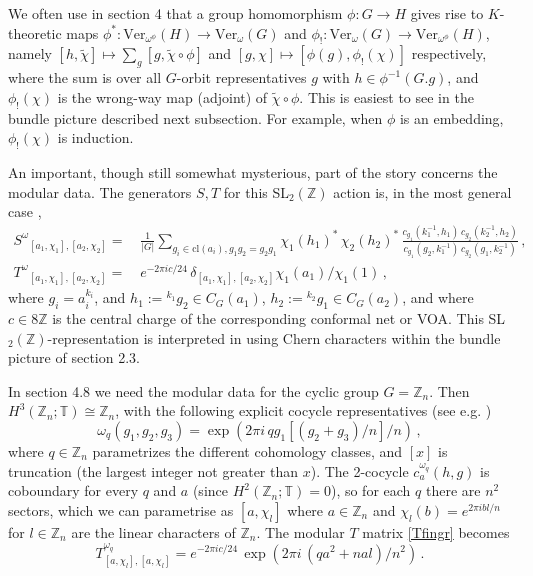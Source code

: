 \documentclass[12pt]{article}
\numberwithin{equation}{section}
\def\bbT           {\mathbb{T}}
\def\bbZ           {\mathbb{Z}}
\begin{document}
We often use in  section 4  that a group homomorphism
$\phi:G\rightarrow H$ gives rise to $K$-theoretic maps $\phi^*:\mathrm{Ver}_{\omega^\phi}(H)\rightarrow
\mathrm{Ver}_\omega(G)$ and $\phi_!:\mathrm{Ver}_\omega(G)\rightarrow \mathrm{Ver}_{\omega^\phi}(H)$, namely $[h,\tilde{\chi}]\mapsto
\sum_g[g,\tilde{\chi}\circ\phi]$ and $[g,\chi]\mapsto [\phi(g),\phi_!(\chi)]$ respectively, where the sum is over all $G$-orbit representatives $g$ with $h\in\phi^{-1}(G.g)$, and $\phi_!(\chi)$ is the wrong-way map (adjoint) of $\tilde{\chi}\circ\phi$. This is easiest to see in the bundle picture described next subsection. For example, when $\phi$ is an embedding, $\phi_!(\chi)$ is induction.


An important, though still somewhat mysterious, part of the story concerns the
modular data. The generators $S,T$ for this  SL$_2(\bbZ)$ action is, in the most general case \cite{CGR}, 
\begin{align}{S^\omega}_{[a_1,\chi_1],[a_2,\chi_2]}=&\,\frac{1}{|G|}\sum_{g_i\in \mathrm{cl}(a_i),g_1g_2=g_2g_1}{\chi_1(h_1)^*}\,{\chi_2(h_2)^*}
\,\frac{c_{g_1}(k_1^{-1},h_1)\,c_{g_2}(k_2^{-1},h_2)}{c_{g_1}(g_2,k_1^{-1})\,c_{g_2}(g_1,k_2^{-1})}\,,\label{Sfingr}\\
{T^\omega}_{[a_1,\chi_1],[a_2,\chi_2]}=&\,e^{-2\pi i c/24}\,\delta_{[a_1,\chi_1],[a_2,\chi_2]}{\chi_1(a_1)}/{\chi_1(1)}\,,\label{Tfingr}\end{align}
where $g_i=a_i^{k_i}$, and $h_1:={}^{k_1}g_2\in C_G(a_1)$, $h_2:={}^{k_2}g_1\in
C_G(a_2)$, and where $c\in 8\bbZ$ is the
central charge of the corresponding conformal net or VOA.
This SL$_2(\bbZ)$-representation  is interpreted in \cite{EG7}
using Chern characters within the bundle picture of section 2.3. 


In section 4.8 we need the modular data for the cyclic group $G = \bbZ_n$. Then $H^3(\bbZ_n;\bbT) \cong \bbZ_n$, with the following explicit cocycle representatives (see e.g. \cite{HWY})
\begin{equation}\label{cyclic3cocycle}\omega_q(g_1, g_2, g_3) = \exp (2\pi i\,qg_1[(g_2 + g_3)/n]/n) \,, \end{equation}
where $q \in \bbZ_n$ parametrizes the different cohomology classes, and $[x]$ is truncation (the largest integer not greater than $x$).
The 2-cocycle $c_a^{\omega_q}(h,g)$ is  coboundary for every $q$ and $a$ (since $H^2(\bbZ_n;\bbT) = 0$), so for each $q$ there are $n^2$ sectors, which we can parametrise as
$[a,\chi_l]$ where $a\in\bbZ_n$ and $\chi_l(b) = e^{2\pi ibl/n}$ for $l \in \bbZ_n$ are the linear characters of $\bbZ_n$. The modular $T$ matrix \eqref{Tfingr} becomes
\begin{equation}
T^{\omega_q}_{[a,\chi_l],[a,\chi_l]} = e^{-2\pi i c/24}\,\exp(2\pi i\,(qa^2 + nal)/n^2) \,.\label{Tcyclic}\end{equation}
\end{document}
